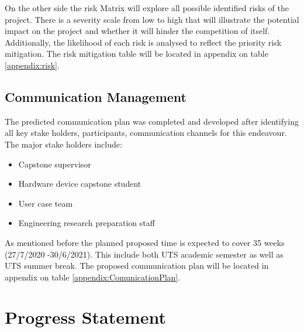 \documentclass[12pt]{report}
\begin{document}
On the other side the risk Matrix will explore all possible identified risks  of the  project. 
There is a severity scale from low to high that will illustrate the potential impact on the project and whether it will hinder the competition of itself.
 Additionally, the likelihood of each risk is analysed to reflect the priority risk mitigation. 
The risk mitigation table will be located in appendix on table \ref{appendix:risk}. 

\section{Communication Management}
The predicted communication plan was completed and developed after identifying all key stake holders, participants, communication channels for this endeavour. The major stake holders include:
\begin{itemize}
  \item Capstone supervisor
  \item Hardware device capstone student
  \item User case team
  \item Engineering research preparation staff
\end{itemize}
As mentioned before the planned proposed time is expected to cover 35 weeks (27/7/2020 -30/6/2021). This include both UTS academic semester as well as UTS summer break. 
The proposed communication plan will be located in appendix on table \ref{appendix:ComunicationPlan}. 



\chapter{Progress Statement}


\nocite{*}   %


\appendix
\end{document}
